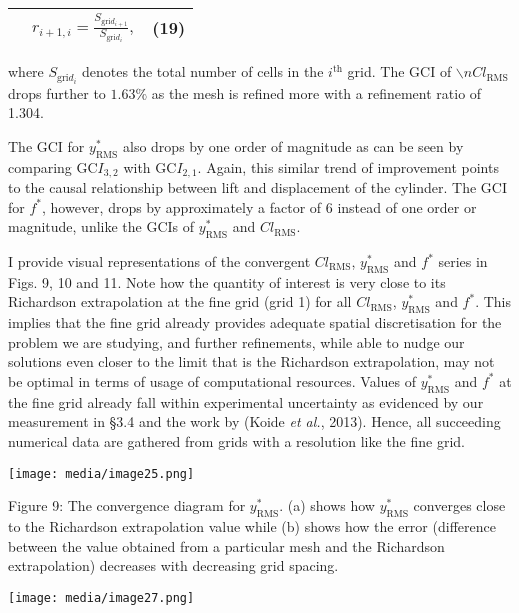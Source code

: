 \documentclass[]{article}
\begin{document}
\begin{longtable}[]{@{}lll@{}}
\toprule
& \(r_{i + 1,i} = \frac{S_{\text{gri}d_{i + 1}}}{S_{\text{gri}d_{i}}},\)
& (19)\tabularnewline
\midrule
\endhead
\bottomrule
\end{longtable}

where \(S_{\text{gri}d_{i}}\) denotes the total number of cells in the
\(i^{\text{th}}\) grid. The GCI of \(\backslash nCl_{\text{RMS}}\) drops
further to \(1.63\%\) as the mesh is refined more with a refinement
ratio of 1.304.

The GCI for \(y_{\text{RMS}}^{*}\) also drops by one order of magnitude
as can be seen by comparing \(\text{GC}I_{3,2}\) with
\(\text{GC}I_{2,1}\). Again, this similar trend of improvement points to
the causal relationship between lift and displacement of the cylinder.
The GCI for \(f^{*}\), however, drops by approximately a factor of 6
instead of one order or magnitude, unlike the GCIs of
\(y_{\text{RMS}}^{*}\) and \(Cl_{\text{RMS}}\).

I provide visual representations of the convergent \(Cl_{\text{RMS}}\),
\(y_{\text{RMS}}^{*}\) and \(f^{*}\) series in Figs. 9, 10 and 11. Note
how the quantity of interest is very close to its Richardson
extrapolation at the fine grid (grid 1) for all \(Cl_{\text{RMS}}\),
\(y_{\text{RMS}}^{*}\) and \(f^{*}\). This implies that the fine grid
already provides adequate spatial discretisation for the problem we are
studying, and further refinements, while able to nudge our solutions
even closer to the limit that is the Richardson extrapolation, may not
be optimal in terms of usage of computational resources. Values of
\(y_{\text{RMS}}^{*}\) and \(f^{*}\) at the fine grid already fall
within experimental uncertainty as evidenced by our measurement in §3.4
and the work by (Koide \emph{et al.}, 2013). Hence, all succeeding
numerical data are gathered from grids with a resolution like the fine
grid.

\texttt{[image: media/image25.png]}

\protect\hypertarget{_Toc41048832}{}{}Figure 9: The convergence diagram
for \(y_{\text{RMS}}^{*}\). (a) shows how \(y_{\text{RMS}}^{*}\)
converges close to the Richardson extrapolation value while (b) shows
how the error (difference between the value obtained from a particular
mesh and the Richardson extrapolation) decreases with decreasing grid
spacing.

\texttt{[image: media/image27.png]}
\end{document}
